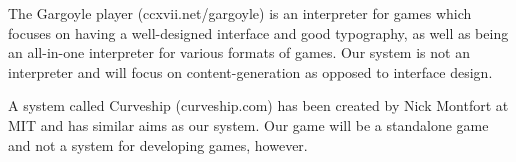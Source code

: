 \documentclass{article}
\begin{document}
The Gargoyle player (ccxvii.net/gargoyle) is an interpreter for games which
focuses on having a well-designed interface and good typography, as well as
being an all-in-one interpreter for various formats of games. Our system is not
an interpreter and will focus on content-generation as opposed to interface
design.

A system called Curveship (curveship.com) has been created by Nick Montfort at
MIT and has similar aims as our system. Our game will be a standalone game and
not a system for developing games, however.
\end{document}

